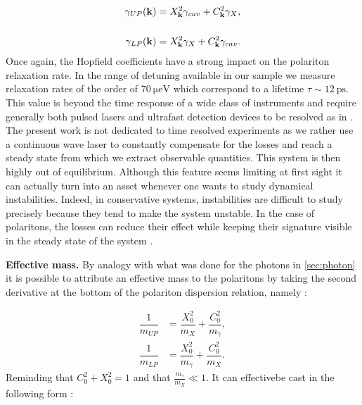 \begin{subequations}
    \begin{align}
    \gamma_{UP}(\mathbf{k})&= X_{\mathbf{k}}^2\gamma_{cav} + C_{\mathbf{k}}^2\gamma_X, \\[5mm]
    \gamma_{LP}(\mathbf{k})&= X_{\mathbf{k}}^2\gamma_X + C_{\mathbf{k}}^2\gamma_{cav}.
    \end{align}
    \label{eq:polariton_relaxation}
\end{subequations}
Once again, the Hopfield coefficients have a strong impact on the polariton relaxation rate. In the range of detuning
available in our sample we measure relaxation rates of the order of  $\SI{70}{\micro\electronvolt}$ which correspond to a lifetime  
$\tau \sim \SI{12}{\pico\second}$. This value is beyond the time response of a wide class of instruments and require generally both pulsed lasers and ultrafast
detection devices to be resolved as in \cite{Utsunomiya_fluidlightexp_2008}. The present work is not dedicated to time resolved experiments as we rather use a continuous wave laser to constantly compensate for the losses and reach a steady state from which we extract observable quantities. This system is then highly out of
equilibrium. Although this feature seems limiting at first sight it can actually turn into an asset whenever one wants to study dynamical instabilities. Indeed, in conservative systems, 
instabilities are difficult to study precisely because they tend to make the system unstable. In the case of polaritons, the losses can reduce 
their effect while keeping their signature visible in the steady state of the system \cite{claude_high-resolution_2022}.

\bigskip


\textbf{Effective mass.} By analogy with what was done for the photons in \autoref{sec:photon} it is possible to attribute an effective mass to the polaritons
by taking the second derivative at the bottom of the polariton dispersion relation, namely :

\begin{subequations}
    \begin{align}
    \dfrac{1}{m_{UP}} &= \dfrac{X_0^2}{m_X}+\dfrac{C_0^2}{m_{\gamma}}, \\
    \dfrac{1}{m_{LP}} &= \dfrac{X_0^2}{m_{\gamma}}+\dfrac{C_0^2}{m_X}.
    \end{align}
\end{subequations}
Reminding that $C_0^2 + X_0^2 = 1$ and that $\frac{m_\gamma}{m_X}\ll 1$. It can  effectivebe cast in the following form :

